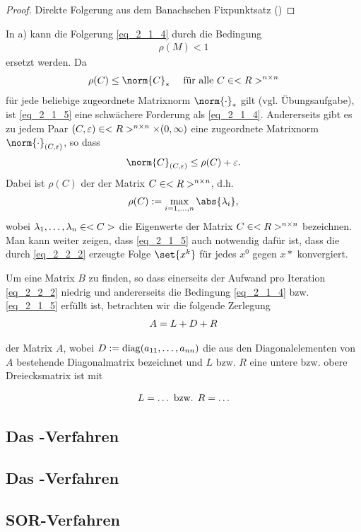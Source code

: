 \begin{proof}
	Direkte Folgerung aus dem Banachschen Fixpunktsatz ()
\end{proof}


\begin{remark}
	In a) kann die Folgerung \eqref{eq_2_1_4} durch die Bedingung
	\begin{align}
	\rho(M) < 1\label{eq_2_1_5}
	\end{align}
	ersetzt werden. Da
	\begin{align}
		\rho(C) \le \norm{C}_{\ast} \quad \text{ für alle } C \in \Rnn \notag
	\end{align}
	für jede beliebige zugeordnete Matrixnorm $\norm{\cdot}_{\ast}$ gilt (vgl. Übungsaufgabe), ist \eqref{eq_2_1_5} eine schwächere Forderung als \eqref{eq_2_1_4}. Andererseits gibt es zu jedem Paar $(C,\varepsilon) \in <R>^{n \times n} \times (0,\infty)$ eine zugeordnete Matrixnorm $\norm{\cdot}_{(C,\epsilon)}$, so dass
	\begin{align}
		\norm{C}_{(C,\epsilon)} \le \rho(C) + \epsilon. \notag
	\end{align}
	Dabei ist $\rho(C)$ der  der Matrix $C \in <R>^{n \times n}$, d.h.
	\begin{align}
		\rho(C) := \max_{i = 1,\dots,n}\abs{\lambda_i}, \notag
	\end{align}
	wobei $\lambda_1,\dots,\lambda_n \in <C>$ die Eigenwerte der Matrix $C \in <R>^{n \times n}$ bezeichnen. Man kann weiter zeigen, dass \eqref{eq_2_1_5} auch notwendig dafür ist, dass die durch \eqref{eq_2_2_2} erzeugte Folge $\set{x^k}$ für jedes $x^0$ gegen $x*$ konvergiert.
\end{remark}

Um eine Matrix $B$ zu finden, so dass einerseits der Aufwand pro Iteration \eqref{eq_2_2_2} niedrig und andererseits die Bedingung \eqref{eq_2_1_4} bzw. \eqref{eq_2_1_5} erfüllt ist, betrachten wir die folgende Zerlegung
\begin{align}
	A = L + D + R \notag
\end{align}

der Matrix $A$, wobei $D:= \operatorname{diag}(a_{11}, \dots, a_{nn})$ die aus den Diagonalelementen von $A$ bestehende Diagonalmatrix bezeichnet und $L$ bzw. $R$ eine untere bzw. obere Dreiecksmatrix ist mit

\begin{align}
	L = \dots \text{ bzw. } R = \dots \notag %
\end{align}

\subsection{Das -Verfahren}

\subsection{Das -Verfahren}

\subsection{SOR-Verfahren}
